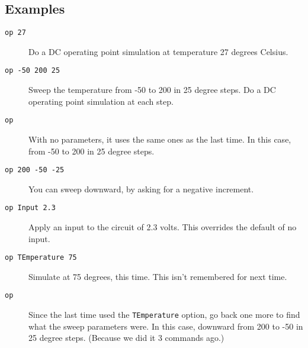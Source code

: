 \subsection{Examples}

\begin{description}

\item[{\tt op 27}] Do a DC operating point simulation at temperature 27
degrees Celsius.

\item[{\tt op -50 200 25}] Sweep the temperature from -50 to 200 in 25
degree steps.  Do a DC operating point simulation at each step.

\item[{\tt op}] With no parameters, it uses the same ones as the last time.
In this case, from -50 to 200 in 25 degree steps.

\item[{\tt op 200 -50 -25}] You can sweep downward, by asking for a negative
increment.

\item[{\tt op Input 2.3}] Apply an input to the circuit of 2.3 volts.  This
overrides the default of no input.

\item[{\tt op TEmperature 75}] Simulate at 75 degrees, this time.  This isn't
remembered for next time.

\item[{\tt op}] Since the last time used the {\tt TEmperature} option, go
back one more to find what the sweep parameters were.  In this case, downward
from 200 to -50 in 25 degree steps.  (Because we did it 3 commands ago.)

\end{description}
